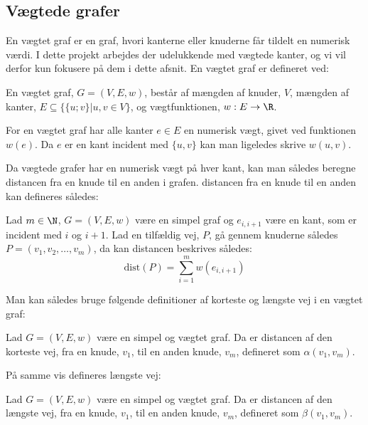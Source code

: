 \subsection{Vægtede grafer}
En vægtet graf er en graf, hvori kanterne eller knuderne får tildelt en numerisk værdi. I dette projekt arbejdes der udelukkende med vægtede kanter, og vi vil derfor kun fokusere på dem i dette afsnit.
En vægtet graf er defineret ved:
\begin{defn}
En vægtet graf, $G=(V,E,w)$, består af mængden af knuder, $V$, mængden af kanter, $E \subseteq \{\{u;v\}|u,v \in V\}$, og vægtfunktionen, $w: E \rightarrow \R$.
\end{defn}


For en vægtet graf har alle kanter $e\in E$ en numerisk vægt, givet ved funktionen $w (e)$. Da $e$ er en kant incident med $\{u,v\}$ kan man  ligeledes skrive $w (u,v)$.


Da vægtede grafer har en numerisk vægt på hver kant, kan man således beregne distancen fra en knude til en anden i grafen. distancen fra en knude til en anden kan defineres således:

\begin{defn}[Distance]
Lad $m\in \N $, $G=(V,E,w)$ være en simpel graf og  $e_{i,i+1}$ være en kant, som er incident med $i$ og $i+1$. Lad en tilfældig vej, $P$, gå gennem knuderne således $P=(v_1,v_2,\dotsc,v_m)$, da kan distancen beskrives således:
	\begin{equation*}
	\mathrm{dist}(P)=\sum_{i=1}^{m}w(e_{i,i+1})
	\end{equation*}  
\end{defn}

Man kan således bruge følgende definitioner af korteste og længste vej i en vægtet graf:


\begin{defn} \label{defn:min.vej}
Lad $G=(V,E,w)$ være en simpel og vægtet graf. Da er distancen af den korteste vej, fra en knude, $v_1$, til en anden knude, $v_m$, defineret som $\alpha(v_1,v_m)$.
\end{defn}

På samme vis defineres længste vej:

\begin{defn} 
Lad $G=(V,E,w)$ være en simpel og vægtet graf. Da er distancen af den længste vej, fra en knude, $v_1$, til en anden knude, $v_m$, defineret som $\beta(v_1,v_m)$.
\end{defn}

